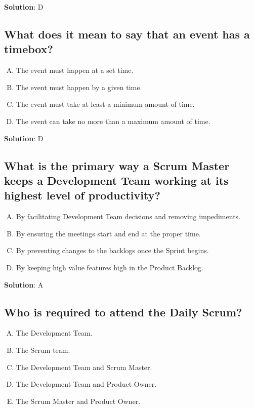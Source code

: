 \textbf{Solution}: D


\subsection{What does it mean to say that an event has a timebox?}
\begin{enumerate}[A)]
  \item The event must happen at a set time.
  \item The event must happen by a given time.
  \item The event must take at least a minimum amount of time.
  \item The event can take no more than a maximum amount of time.
\end{enumerate}


\textbf{Solution}: D


\subsection{What is the primary way a Scrum Master keeps a Development Team working at its highest level of productivity?}
\begin{enumerate}[A)]
  \item By facilitating Development Team decisions and removing impediments.
  \item By ensuring the meetings start and end at the proper time.
  \item By preventing changes to the backlogs once the Sprint begins.
  \item By keeping high value features high in the Product Backlog.
\end{enumerate}


\textbf{Solution}: A


\subsection{Who is required to attend the Daily Scrum?}
\begin{enumerate}[A)]
  \item The Development Team.
  \item The Scrum team.
  \item The Development Team and Scrum Master.
  \item The Development Team and Product Owner.
  \item The Scrum Master and Product Owner.
\end{enumerate}


